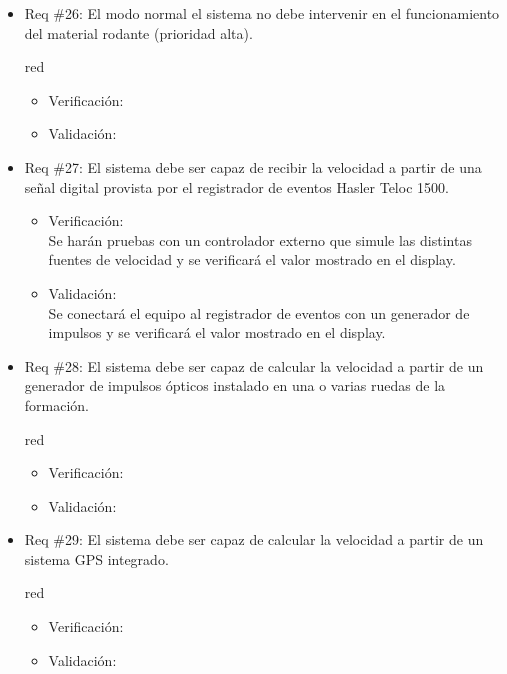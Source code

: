 \documentclass[11pt]{charter}
\begin{document}
\begin{itemize}
\item Req \#26: El modo normal el sistema no debe intervenir en el funcionamiento del material rodante (prioridad alta).
\begin{consigna}{red}
\begin{itemize}
  \item Verificación:\\
  \item Validación:\\
\end{itemize}
\end{consigna}

\item Req \#27: El sistema debe ser capaz de recibir la velocidad a partir de una señal digital provista por el registrador de eventos Hasler Teloc 1500. 
\begin{itemize}
  \item Verificación:\\
  Se harán pruebas con un controlador externo que simule las distintas fuentes de velocidad y se verificará el valor mostrado en el display.
  \item Validación:\\
  Se conectará el equipo al registrador de eventos con un generador de impulsos y se verificará el valor mostrado en el display.
\end{itemize}

\item Req \#28: El sistema debe ser capaz de calcular la velocidad a partir de un generador de impulsos ópticos instalado en una o varias ruedas de la formación.
\begin{consigna}{red}
\begin{itemize}
  \item Verificación:\\
  \item Validación:\\
\end{itemize}
\end{consigna}

\item Req \#29: El sistema debe ser capaz de calcular la velocidad a partir de un sistema GPS integrado.
\begin{consigna}{red}
\begin{itemize}
  \item Verificación:\\
  \item Validación:\\
\end{itemize}
\end{consigna}


\end{itemize}
\end{document}
